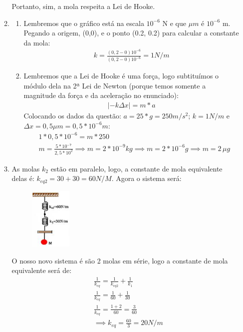 \documentclass[12pt,letterpaper,fleqn]{article}
\begin{document}
\begin{itemize}
\begin{enumerate}
    Portanto, sim, a mola respeita a Lei de Hooke.
    
    \item
    \begin{enumerate}
        \item Lembremos que o gráfico está na escala $10^{-6}$ N e que $\mu m$ é $10^{-6}$ m. Pegando a origem, (0,0), e o ponto (0.2, 0.2) para calcular a constante da mola:
        \begin{align*}
            k = \frac{(0,2 - 0)10^{-6}}{(0,2-0)10^{-6}} = 1 N/m
        \end{align*}
        
        \item Lembremos que a Lei de Hooke é uma força, logo subtituímos o módulo dela na 2ª Lei de Newton (porque temos somente a magnitude da força e da aceleração no enunciado):
        \begin{align*}
            |-k \Delta x| = m*a
        \end{align*}
        Colocando os dados da questão: $a = 25*g = 250 m/s^2$; $k=1 N/m$ e $\Delta x = 0,5  \mu m = 0,5*10^{-6}m$:
        \begin{align*}
            &1*0,5 *10^{-6} = m*250 \\
            &m = \frac{5*10^{-7}}{2,5*10^2} \implies m = 2*10^{-9} kg \implies m = 2*10^{-6} g  \implies m = 2\, \mu g
        \end{align*}
    \end{enumerate}
    \item As molas $k_2$ estão em paralelo, logo, a constante de mola equivalente delas é: $k_{eq2} = 30 + 30 = 60 N/M$. Agora o sistema será:
    \begin{figure}[h]
        \centering
        \includegraphics[width=0.2\textwidth]{resolucao_6.jpg}
    \end{figure}
    
    O nosso novo sistema é são 2 molas em série, logo a constante de mola equivalente será de:
    \begin{align*}
        &\frac{1}{k_{eq}} = \frac{1}{k_{eq2}} + \frac{1}{k_{1}} \\ &\frac{1}{k_{eq}} = \frac{1}{60} + \frac{1}{30}\\
        &\frac{1}{k_{eq}} = \frac{1 + 2}{60} = \frac{3}{60}\\
        &\implies k_{eq} = \frac{60}{3} = 20 N/m
    \end{align*}
    

\end{enumerate}
\end{itemize}
\end{document}
